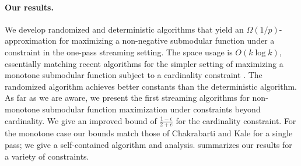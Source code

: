 \documentclass[oneside,letterpaper]{scrartcl} \usepackage{macros}
\newcommand{\eps}{\epsilon}
\begin{document}
\paragraph{Our results.} We develop randomized and deterministic
algorithms that yield an $\Omega(1/p)$-approximation for maximizing a
non-negative submodular function under a 
constraint in the one-pass streaming setting. The space usage is $O(k
\log k)$, essentially matching recent algorithms for the simpler
setting of maximizing a monotone submodular function subject to a
cardinality constraint \cite{bmkk-sso-14}. The randomized algorithm
achieves better constants than the deterministic algorithm. As far as
we are aware, we present the first streaming algorithms for
non-monotone submodular function maximization under constraints beyond
cardinality.  We give an improved bound of $\frac{1-\eps}{2+e}$ for
the cardinality constraint.  For the monotone case our bounds match
those of Chakrabarti and Kale \cite{ck-smms-14} for a single pass; we
give a self-contained algorithm and analysis. 
summarizes our results for a variety of constraints.

\iffalse
\subsection{Our Results}
We give a simple and efficient streaming algorithm for submodular
maximization subject to a \refterm{$p$-matchoid} constraint, which
generalizes a wide class of independence constraints. Detailed
definition of the constraints are presented in
\refsection{preliminaries}.
\begin{itemize}
\item We give an $O(p) + \epsilon $-approximation for maximizing
  nonnegative submodular function subject to
  \refterm{$p$-matchoid}s. The algorithm makes a single pass over the
  datastream and uses $O(\frac{k\log k}{\epsilon^2})$ memory where $k$
  is an upper bound on the rank of the
  \refterm{$p$-matchoid}. \refterm{$p$-matchoid}s generalizes
  intersection of $p$-matroids, and $b$-matching in hypergraph of rank
  $p$. Thus the result extends to these special cases as well. In
  particular for a single matroid we get $(8.55 +
  \epsilon)$-approximation in a single pass. Refer
  \refsection{nonnegative-matchoid}.

\item As a corollary of the technique developed in this paper we get a
  $4p$ approximation in the monotone case, which matches the existing
  result of Chakrabarti and Kale \cite{ck-smms-14}, and is
  conceptually much simpler.

\end{itemize}
\fi
\end{document}
